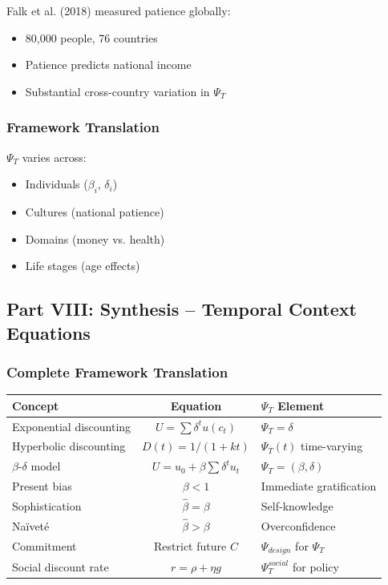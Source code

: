 Falk et al. (2018) measured patience globally:
\begin{itemize}
    \item 80,000 people, 76 countries
    \item Patience predicts national income
    \item Substantial cross-country variation in $\Psi_T$
\end{itemize}

\subsubsection{Framework Translation}

$\Psi_T$ varies across:
\begin{itemize}
    \item Individuals ($\beta_i$, $\delta_i$)
    \item Cultures (national patience)
    \item Domains (money vs. health)
    \item Life stages (age effects)
\end{itemize}

\subsection{Part VIII: Synthesis – Temporal Context Equations}

\subsubsection{Complete Framework Translation}

\begin{center}
\renewcommand{\arraystretch}{1.5}
\begin{tabular}{|l|c|l|}
\hline
\textbf{Concept} & \textbf{Equation} & \textbf{$\Psi_T$ Element} \\
\hline
Exponential discounting & $U = \sum \delta^t u(c_t)$ & $\Psi_T = \delta$ \\
\hline
Hyperbolic discounting & $D(t) = 1/(1+kt)$ & $\Psi_T(t)$ time-varying \\
\hline
$\beta$-$\delta$ model & $U = u_0 + \beta \sum \delta^t u_t$ & $\Psi_T = (\beta, \delta)$ \\
\hline
Present bias & $\beta < 1$ & Immediate gratification \\
\hline
Sophistication & $\hat{\beta} = \beta$ & Self-knowledge \\
\hline
Naïveté & $\hat{\beta} > \beta$ & Overconfidence \\
\hline
Commitment & Restrict future $C$ & $\Psi_{design}$ for $\Psi_T$ \\
\hline
Social discount rate & $r = \rho + \eta g$ & $\Psi_T^{social}$ for policy \\
\hline
\end{tabular}
\end{center}

